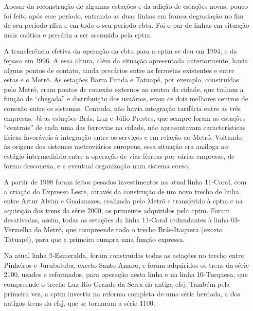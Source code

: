 \documentclass[11pt,fleqn]{book} %
\begin{document}
Apesar da reconstrução de algumas estações e da adição de estações novas, pouco foi feito após esse período, entrando as duas linhas em franca degradação no fim de seu período \gls{rffsa} e em todo o seu período \gls{cbtu}. Foi o par de linhas em situação mais caótica e precária a ser assumido pela \gls{cptm}.



A transferência efetiva da operação da \gls{cbtu} para a \gls{cptm} se deu em 1994, e da \gls{fepasa} em 1996. A essa altura, além da situação apresentada anteriormente, havia alguns pontos de contato, ainda precários entre as ferrovias existentes e entre estas e o Metrô. As estações Barra Funda e Tatuapé, por exemplo, construídas pelo Metrô, eram pontos de conexão externos ao centro da cidade, que tinham a função de \enquote{chegada} e distribuição dos usuários, eram os dois melhores centros de conexão entre os sistemas. Contudo, não havia integração tarifária entre as três empresas. Já as estações Brás, Luz e Júlio Prestes, que sempre foram as estações \enquote{centrais} de cada uma das ferrovias na cidade, não apresentavam características físicas favoráveis à integração entre os serviços e em relação ao Metrô. Voltando às origens dos sistemas metroviários europeus, essa situação era análoga ao estágio intermediário entre a operação de vias férreas por várias empresas, de forma desconexa, e a eventual organização num sistema coeso.

A partir de 1998 foram feitos pesados investimentos na atual linha 11-Coral, com a criação do Expresso Leste, através da construção de um novo trecho de linha, entre Artur Alvim e Guaianazes, realizada pelo Metrô e transferido à \gls{cptm} e na aquisição dos trens da série 2000, os primeiros adquiridos pela \gls{cptm}. Foram desativadas, assim, todas as estações da linha 11-Coral redundantes à linha 03-Vermelha do Metrô, que compreende todo o trecho Brás-Itaquera (exceto Tatuapé), para que a primeira cumpra uma função expressa.


Na atual linha 9-Esmeralda, foram construídas todas as estações no trecho entre Pinheiros e Jurubatuba, exceto Santo Amaro, e foram adquiridos os trens da série 2100, usados e reformados, para operação nesta linha e na linha 10-Turquesa, que compreende o trecho Luz-Rio Grande da Serra da antiga \gls{efsj}. Também pela primeira vez, a \gls{cptm} investiu na reforma completa de uma série herdada, a dos antigos trens da \gls{efsj}, que se tornaram a série 1100.
\end{document}
